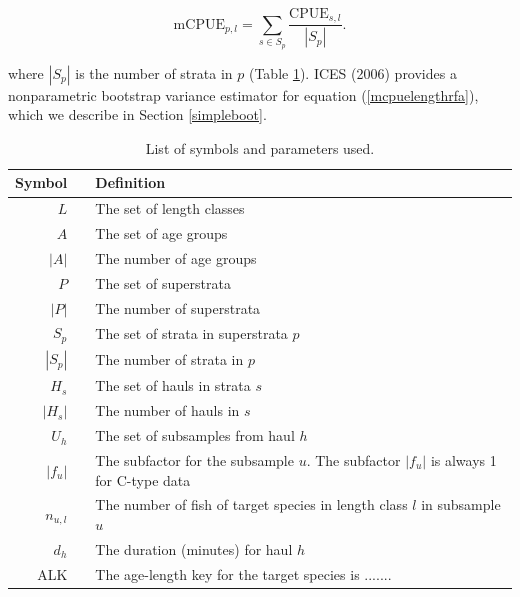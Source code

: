 \documentclass[a4paper 12pt]{article}
\numberwithin{equation}{section}
\begin{document}
\begin{equation}
\mathrm{mCPUE}_{p,l} = \sum\limits_{s \in S_{p}} \frac{\mathrm{CPUE}_{s,l}}{|S_{p}|}.
\label{mcpuelengthrfa}
\end{equation}

where $|S_{p}|$ is the number of strata in $p$ (Table \ref{symbols}). ICES (2006) provides a nonparametric bootstrap variance estimator for equation (\ref{mcpuelengthrfa}), which we describe in Section \ref{simpleboot}. 

\clearpage
\begin{table}[h!]
\centering
\caption{List of symbols and parameters used.}
\label{symbols}
\begin{tabularx}{\linewidth}{r l X}
\toprule 
Symbol   	&  & Definition                  \\[0.7ex]
\midrule
$L$        	&  & The set of length classes    \\[0.7ex]
$A$        	&  & The set of age groups       \\[0.7ex]
$|A|$      	&  & The number of age groups    \\[0.7ex]
$P$        	&  & The set of superstrata      \\[0.7ex]
$|P|$       &  & The number of superstrata   \\[0.7ex]
$S_{p}$     &  & The set of strata in superstrata $p$  \\[0.7ex]
$|S_{p}|$   &  & The number of strata in $p$  \\[0.7ex]
$H_{s}$     &  & The set of hauls in strata $s$  \\[0.7ex]
$|H_{s}|$   &  & The number of hauls in $s$  \\[0.7ex]
$U_{h}$     &  & The set of subsamples from haul $h$  \\[0.7ex]
$|f_{u}|$   &  & The subfactor for the subsample $u$. The subfactor $|f_{u}|$ is always 1 for C-type data  \\[0.7ex]
$n_{u,l}$   &  & The number of fish of target species in length class $l$ in subsample $u$  \\[0.7ex]
$d_{h}$   &  & The duration (minutes) for haul $h$  \\[0.7ex]
ALK  & & The age-length key for the target species is .......\\
\bottomrule         
\end{tabularx}
\end{table}
\end{document}
